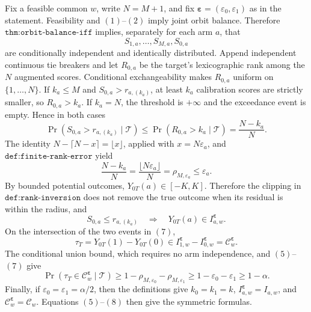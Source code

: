 Fix a feasible common \(w\), write \(N=M+1\), and fix \(\boldsymbol\varepsilon=(\varepsilon_0,\varepsilon_1)\) as in the statement. Feasibility and \((1)\)--\((2)\) imply joint orbit balance. Therefore \(\texttt{thm:orbit-balance-iff}\) implies, separately for each arm \(a\), that
\[
S_{1,a},\ldots,S_{M,a},S_{0,a}
\]
are conditionally independent and identically distributed. Append independent continuous tie breakers and let \(R_{0,a}\) be the target's lexicographic rank among the \(N\) augmented scores. Conditional exchangeability makes \(R_{0,a}\) uniform on \(\{1,\ldots,N\}\). If \(k_a\le M\) and \(S_{0,a}>r_{a,(k_a)}\), at least \(k_a\) calibration scores are strictly smaller, so \(R_{0,a}>k_a\). If \(k_a=N\), the threshold is \(+\infty\) and the exceedance event is empty. Hence in both cases
\[
\Pr\!\left(S_{0,a}>r_{a,(k_a)}\mid\mathcal T\right)\le\Pr(R_{0,a}>k_a\mid\mathcal T)=\frac{N-k_a}{N}.\tag{5}
\]
The identity \(N-\lceil N-x\rceil=\lfloor x\rfloor\), applied with \(x=N\varepsilon_a\), and \(\texttt{def:finite-rank-error}\) yield
\[
\frac{N-k_a}{N}=\frac{\lfloor N\varepsilon_a\rfloor}{N}=\rho_{M,\varepsilon_a}\le\varepsilon_a.\tag{6}
\]
By bounded potential outcomes, \(Y_{0T}(a)\in[-K,K]\). Therefore the clipping in \(\texttt{def:rank-inversion}\) does not remove the true outcome when its residual is within the radius, and
\[
S_{0,a}\le r_{a,(k_a)}\quad\Longrightarrow\quad Y_{0T}(a)\in I^{\boldsymbol\varepsilon}_{a,w}.\tag{7}
\]
On the intersection of the two events in \((7)\),
\[
\tau_T=Y_{0T}(1)-Y_{0T}(0)\in I^{\boldsymbol\varepsilon}_{1,w}-I^{\boldsymbol\varepsilon}_{0,w}=\mathcal C^{\boldsymbol\varepsilon}_w.
\]
The conditional union bound, which requires no arm independence, and \((5)\)--\((7)\) give
\[
\Pr\!\left(\tau_T\in\mathcal C^{\boldsymbol\varepsilon}_w\mid\mathcal T\right)\ge1-\rho_{M,\varepsilon_0}-\rho_{M,\varepsilon_1}\ge1-\varepsilon_0-\varepsilon_1\ge1-\alpha.\tag{8}
\]
Finally, if \(\varepsilon_0=\varepsilon_1=\alpha/2\), then the definitions give \(k_0=k_1=k\), \(I^{\boldsymbol\varepsilon}_{a,w}=I_{a,w}\), and \(\mathcal C^{\boldsymbol\varepsilon}_w=\mathcal C_w\). Equations \((5)\)--\((8)\) then give the symmetric formulas.
